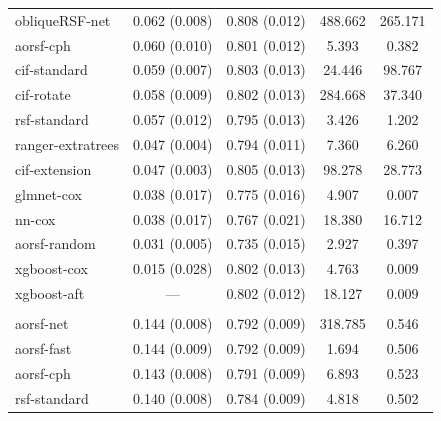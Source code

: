 \documentclass{article}\usepackage[]{graphicx}\usepackage[]{xcolor}
\newenvironment{knitrout}{}{} %
\begin{document}
\begin{knitrout}
\begin{longtable}[t]{lcccc}
\hspace{1em}obliqueRSF-net & 0.062 (0.008) & 0.808 (0.012) & 488.662 & 265.171\\
\hspace{1em}aorsf-cph & 0.060 (0.010) & 0.801 (0.012) & 5.393 & 0.382\\
\hspace{1em}cif-standard & 0.059 (0.007) & 0.803 (0.013) & 24.446 & 98.767\\
\hspace{1em}cif-rotate & 0.058 (0.009) & 0.802 (0.013) & 284.668 & 37.340\\
\hspace{1em}rsf-standard & 0.057 (0.012) & 0.795 (0.013) & 3.426 & 1.202\\
\hspace{1em}ranger-extratrees & 0.047 (0.004) & 0.794 (0.011) & 7.360 & 6.260\\
\hspace{1em}cif-extension & 0.047 (0.003) & 0.805 (0.013) & 98.278 & 28.773\\
\hspace{1em}glmnet-cox & 0.038 (0.017) & 0.775 (0.016) & 4.907 & 0.007\\
\hspace{1em}nn-cox & 0.038 (0.017) & 0.767 (0.021) & 18.380 & 16.712\\
\hspace{1em}aorsf-random & 0.031 (0.005) & 0.735 (0.015) & 2.927 & 0.397\\
\hspace{1em}xgboost-cox & 0.015 (0.028) & 0.802 (0.013) & 4.763 & 0.009\\
\hspace{1em}xgboost-aft & --- & 0.802 (0.012) & 18.127 & 0.009\\
\addlinespace[0.3em]
\multicolumn{5}{l}{\textit{\textbf{MESA; death, n = 6793, p = 48}}}\\
\hline
\hspace{1em}aorsf-net & 0.144 (0.008) & 0.792 (0.009) & 318.785 & 0.546\\
\hspace{1em}aorsf-fast & 0.144 (0.009) & 0.792 (0.009) & 1.694 & 0.506\\
\hspace{1em}aorsf-cph & 0.143 (0.008) & 0.791 (0.009) & 6.893 & 0.523\\
\hspace{1em}rsf-standard & 0.140 (0.008) & 0.784 (0.009) & 4.818 & 0.502\\

\end{longtable}
\end{knitrout}
\end{document}
